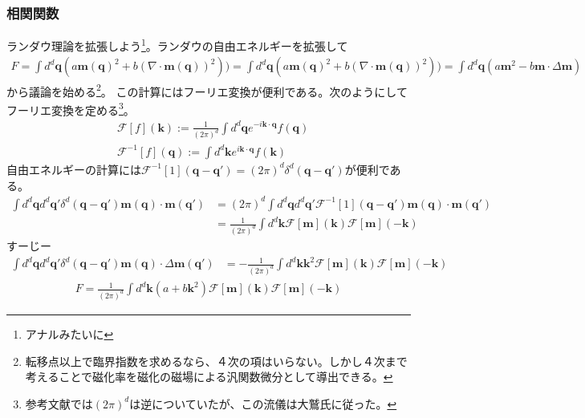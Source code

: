 \documentclass[autodetect-engine,dvipdfmx-if-dvi,ja=standard]{bxjsarticle}
\theoremstyle{break}
\begin{document}
            \subsubsection{相関関数}
                ランダウ理論を拡張しよう\footnote{アナルみたいに}。ランダウの自由エネルギーを拡張して
                \begin{align}
                    F=\int d^d \bm{q}(a\bm{m}(\bm{q})^2+b(\nabla\cdot\bm{m}(\bm{q}))^2))=\int d^d \bm{q}(a\bm{m}(\bm{q})^2+b(\nabla\cdot\bm{m}(\bm{q}))^2))=\int d^d \bm{q}(a\bm{m}^2-b\bm{m}\cdot \Delta \bm{m})
                    \label{2.47}
                \end{align}
                から議論を始める\footnote{転移点以上で臨界指数を求めるなら、４次の項はいらない。しかし４次まで考えることで磁化率を磁化の磁場による汎関数微分として導出できる。}。
                この計算にはフーリエ変換が便利である。次のようにしてフーリエ変換を定める\footnote{参考文献では$(2\pi)^d$は逆についていたが、この流儀は大鷲氏に従った。}。
                \begin{align}
                    &\mathcal{F}[f](\bm{k}):=\frac{1}{(2\pi)^d}\int d^d \bm{q}e^{-i\bm{k}\cdot\bm{q}}f(\bm{q})\\
                    &\mathcal{F}^{-1}[f](\bm{q}):=\int d^d \bm{k}e^{i\bm{k}\cdot\bm{q}}f(\bm{k})
                \end{align}
                自由エネルギーの計算には$\mathcal{F}^{-1}[1](\bm{q}-\bm{q}')=(2\pi)^d\delta^d (\bm{q}-\bm{q}')$が便利である。
                \begin{align}
                    \int d^d \bm{q}d^d \bm{q}' \delta^d (\bm{q}-\bm{q}') \bm{m}(\bm{q})\cdot\bm{m}(\bm{q}')
                    &=(2\pi)^d\int d^d \bm{q}d^d \bm{q}' \mathcal{F}^{-1}[1](\bm{q}-\bm{q}') \bm{m}(\bm{q})\cdot\bm{m}(\bm{q}')\\
                    &=\frac{1}{(2\pi)^d}\int d^d \bm{k}\mathcal{F}[\bm{m}](\bm{k})\mathcal{F}[\bm{m}](-\bm{k})
                \end{align}
                すーじー
                \begin{align}
                    \int d^d \bm{q}d^d \bm{q}' \delta^d (\bm{q}-\bm{q}') \bm{m}(\bm{q})\cdot \Delta \bm{m}(\bm{q}')
                    &=-\frac{1}{(2\pi)^d}\int d^d \bm{k}\bm{k}^2\mathcal{F}[\bm{m}](\bm{k})\mathcal{F}[\bm{m}](-\bm{k})
                \end{align}
                \begin{align}
                    F=\frac{1}{(2\pi)^d}\int d^d \bm{k}(a+b\bm{k}^2)\mathcal{F}[\bm{m}](\bm{k})\mathcal{F}[\bm{m}](-\bm{k})
                \end{align}
\end{document}
